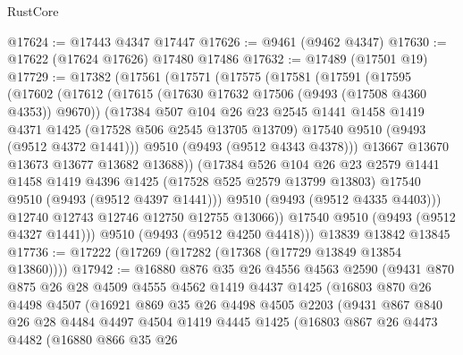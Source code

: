\begin{lexlean}{RustCore}
\begin{coremodule}
@17624 := @17443 @4347 @17447
@17626 := @9461 (@9462 @4347)
@17630 := @17622 (@17624 @17626) @17480 @17486
@17632 := @17489 (@17501 @19)
@17729 := @17382
    (@17561
      (@17571
        (@17575
          (@17581
            (@17591
              (@17595
                (@17602
                  (@17612
                    (@17615 (@17630 @17632 @17506 (@9493 (@17508 @4360 @4353)) @9670))
                    (@17384
                      @507
                      @104
                      @26
                      @23
                      @2545
                      @1441
                      @1458
                      @1419
                      @4371
                      @1425
                      (@17528 @506 @2545 @13705 @13709)
                      @17540
                      @9510
                      (@9493 (@9512 @4372 @1441)))
                    @9510
                    (@9493 (@9512 @4343 @4378)))
                  @13667
                  @13670
                  @13673
                  @13677
                  @13682
                  @13688))
              (@17384
                @526
                @104
                @26
                @23
                @2579
                @1441
                @1458
                @1419
                @4396
                @1425
                (@17528 @525 @2579 @13799 @13803)
                @17540
                @9510
                (@9493 (@9512 @4397 @1441)))
              @9510
              (@9493 (@9512 @4335 @4403)))
            @12740
            @12743
            @12746
            @12750
            @12755
            @13066))
        @17540
        @9510
        (@9493 (@9512 @4327 @1441)))
      @9510
      (@9493 (@9512 @4250 @4418)))
    @13839
    @13842
    @13845
@17736 := @17222 (@17269 (@17282 (@17368 (@17729 @13849 @13854 @13860))))
@17942 := @16880
    @876
    @35
    @26
    @4556
    @4563
    @2590
    (@9431
      @870
      @875
      @26
      @28
      @4509
      @4555
      @4562
      @1419
      @4437
      @1425
      (@16803
        @870
        @26
        @4498
        @4507
        (@16921
          @869
          @35
          @26
          @4498
          @4505
          @2203
          (@9431
            @867
            @840
            @26
            @28
            @4484
            @4497
            @4504
            @1419
            @4445
            @1425
            (@16803
              @867
              @26
              @4473
              @4482
              (@16880
                @866
                @35
                @26

\end{coremodule}
\end{lexlean}
